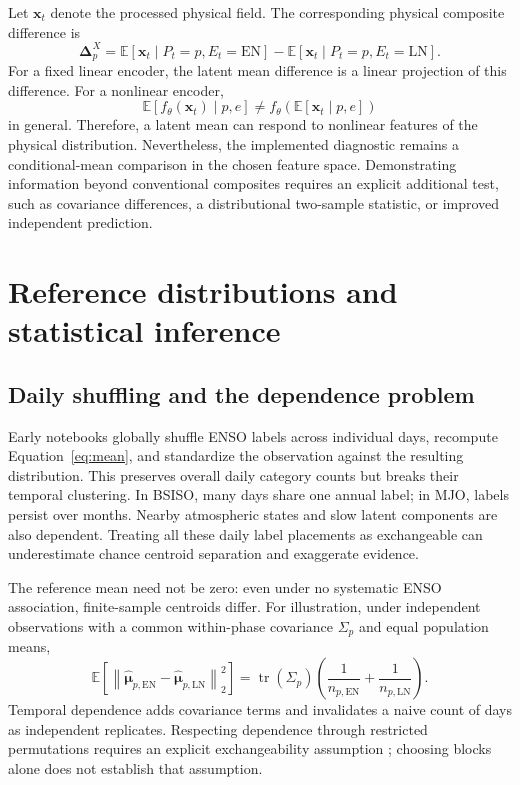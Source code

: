 \documentclass[11pt]{article}
\newcommand{\EN}{\mathrm{EN}}
\newcommand{\LN}{\mathrm{LN}}
\newcommand{\E}{\mathbb{E}}
\begin{document}
Let $\mathbf x_t$ denote the processed physical field. The corresponding physical composite difference is
\begin{equation}
\boldsymbol\Delta_p^X=
\E[\mathbf x_t\mid P_t=p,E_t=\EN]
-\E[\mathbf x_t\mid P_t=p,E_t=\LN].
\end{equation}
For a fixed linear encoder, the latent mean difference is a linear projection of this difference. For a nonlinear encoder,
\begin{equation}
\E[f_\theta(\mathbf x_t)\mid p,e]
\ne f_\theta\!\left(\E[\mathbf x_t\mid p,e]\right)
\end{equation}
in general. Therefore, a latent mean can respond to nonlinear features of the physical distribution. Nevertheless, the implemented diagnostic remains a conditional-mean comparison in the chosen feature space. Demonstrating information beyond conventional composites requires an explicit additional test, such as covariance differences, a distributional two-sample statistic, or improved independent prediction.

\section{Reference distributions and statistical inference}
\label{sec:null}

\subsection{Daily shuffling and the dependence problem}

Early notebooks globally shuffle ENSO labels across individual days, recompute Equation~\eqref{eq:mean}, and standardize the observation against the resulting distribution. This preserves overall daily category counts but breaks their temporal clustering. In BSISO, many days share one annual label; in MJO, labels persist over months. Nearby atmospheric states and slow latent components are also dependent. Treating all these daily label placements as exchangeable can underestimate chance centroid separation and exaggerate evidence.

The reference mean need not be zero: even under no systematic ENSO association, finite-sample centroids differ. For illustration, under independent observations with a common within-phase covariance $\Sigma_p$ and equal population means,
\begin{equation}
\E\!\left[\left\|
\widehat{\boldsymbol\mu}_{p,\EN}
-\widehat{\boldsymbol\mu}_{p,\LN}
\right\|_2^2\right]
=\operatorname{tr}(\Sigma_p)
\left(\frac{1}{n_{p,\EN}}+\frac{1}{n_{p,\LN}}\right).
\end{equation}
Temporal dependence adds covariance terms and invalidates a naive count of days as independent replicates. Respecting dependence through restricted permutations requires an explicit exchangeability assumption \cite{winkler2015}; choosing blocks alone does not establish that assumption.
\end{document}
